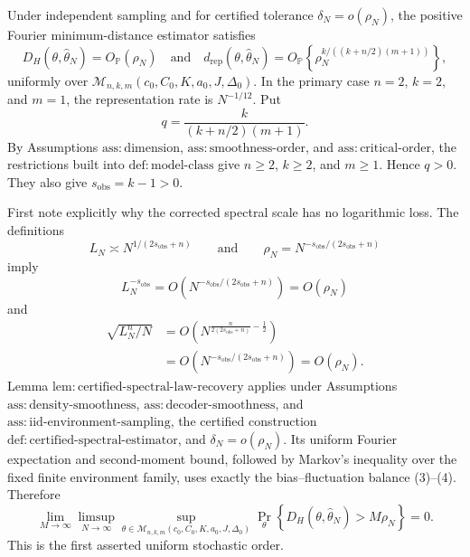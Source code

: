 Under independent sampling and for certified tolerance \(\delta_N=o(\rho_N)\), the positive Fourier minimum-distance estimator satisfies
\[
D_H(\theta,\widehat\theta_N)=O_{\mathbb P}(\rho_N)
\quad\text{and}\quad
d_{\mathrm{rep}}(\theta,\widehat\theta_N)
=O_{\mathbb P}\!\left\{\rho_N^{k/((k+n/2)(m+1))}\right\},
\]
uniformly over \(\mathcal M_{n,k,m}(c_0,C_0,K,a_0,J,\Delta_0)\). In the primary case \(n=2\), \(k=2\), and \(m=1\), the representation rate is \(N^{-1/12}\).
Put
\[
q=\frac{k}{(k+n/2)(m+1)}.
\tag{1}
\]
By Assumptions \(\mathrm{ass:dimension}\), \(\mathrm{ass:smoothness\text{-}order}\), and \(\mathrm{ass:critical\text{-}order}\), the restrictions built into \(\mathrm{def:model\text{-}class}\) give \(n\geq2\), \(k\geq2\), and \(m\geq1\). Hence \(q>0\). They also give \(s_{\mathrm{obs}}=k-1>0\).

First note explicitly why the corrected spectral scale has no logarithmic loss. The definitions
\[
L_N\asymp N^{1/(2s_{\mathrm{obs}}+n)}
\qquad\text{and}\qquad
\rho_N=N^{-s_{\mathrm{obs}}/(2s_{\mathrm{obs}}+n)}
\tag{2}
\]
imply
\[
L_N^{-s_{\mathrm{obs}}}
=O\!\left(N^{-s_{\mathrm{obs}}/(2s_{\mathrm{obs}}+n)}\right)
=O(\rho_N)
\tag{3}
\]
and
\[
\begin{aligned}
\sqrt{L_N^n/N}
&=O\!\left(
N^{\frac{n}{2(2s_{\mathrm{obs}}+n)}-\frac12}
\right)\\
&=O\!\left(N^{-s_{\mathrm{obs}}/(2s_{\mathrm{obs}}+n)}\right)
=O(\rho_N).
\end{aligned}
\tag{4}
\]
Lemma \(\mathrm{lem:certified\text{-}spectral\text{-}law\text{-}recovery}\) applies under Assumptions \(\mathrm{ass:density\text{-}smoothness}\), \(\mathrm{ass:decoder\text{-}smoothness}\), and \(\mathrm{ass:iid\text{-}environment\text{-}sampling}\), the certified construction \(\mathrm{def:certified\text{-}spectral\text{-}estimator}\), and \(\delta_N=o(\rho_N)\). Its uniform Fourier expectation and second-moment bound, followed by Markov's inequality over the fixed finite environment family, uses exactly the bias--fluctuation balance (3)--(4). Therefore
\[
\lim_{M\to\infty}\limsup_{N\to\infty}
\sup_{\theta\in\mathcal M_{n,k,m}(c_0,C_0,K,a_0,J,\Delta_0)}
\Pr_\theta\!\left\{D_H(\theta,\widehat\theta_N)>M\rho_N\right\}=0.
\tag{5}
\]
This is the first asserted uniform stochastic order.

